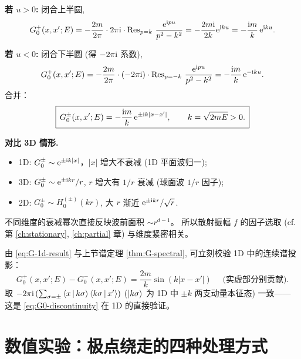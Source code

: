 \textbf{若 $u>0$:} 闭合上半圆,
\begin{equation}
  G_0^+(x,x';E)
  = -\frac{2m}{2\pi}\cdot 2\pi\mathrm{i}\cdot\operatorname{Res}_{p=k}\,\frac{\mathrm{e}^{\mathrm{i} pu}}{p^2-k^2}
  = -\frac{2m\mathrm{i}}{2k}\mathrm{e}^{\mathrm{i} ku}
  = -\frac{\mathrm{i} m}{k}\,\mathrm{e}^{\mathrm{i} ku}.
\end{equation}

\textbf{若 $u<0$:} 闭合下半圆 (得 $-2\pi\mathrm{i}$ 系数),
\begin{equation}
  G_0^+(x,x';E)
  = -\frac{2m}{2\pi}\cdot(-2\pi\mathrm{i})\cdot\operatorname{Res}_{p=-k}\,\frac{\mathrm{e}^{\mathrm{i} pu}}{p^2-k^2}
  = -\frac{\mathrm{i} m}{k}\,\mathrm{e}^{-\mathrm{i} ku}.
\end{equation}
合并：
\begin{equation}\label{eq:G-1d-result}
  \boxed{\,G_0^\pm(x,x';E) = -\frac{\mathrm{i} m}{k}\,\mathrm{e}^{\pm\mathrm{i} k|x-x'|},\qquad k=\sqrt{2mE}>0.\,}
\end{equation}

\textbf{对比 3D 情形.}
\begin{itemize}
  \item 1D: $G_0^\pm \sim \mathrm{e}^{\pm\mathrm{i} k|x|}$，$|x|$ 增大不衰减 (1D 平面波归一);
  \item 3D: $G_0^\pm \sim \mathrm{e}^{\pm\mathrm{i} kr}/r$, $r$ 增大有 $1/r$ 衰减 (球面波 $1/r$ 因子);
  \item 2D: $G_0^\pm \sim H_0^{(\pm)}(kr)$, 大 $r$ 渐近 $\mathrm{e}^{\pm\mathrm{i} kr}/\sqrt{r}$.
\end{itemize}
不同维度的衰减幂次直接反映波前面积 $\sim r^{d-1}$。
所以散射振幅 $f$ 的因子选取 (cf. 第 \ref{ch:stationary}, \ref{ch:partial} 章) 与维度紧密相关。

\begin{remark}
由 \eqref{eq:G-1d-result} 与上节谱定理 \ref{thm:G-spectral}, 可立刻校验 1D 中的连续谱投影：
\begin{equation}
  G_0^+(x,x';E)-G_0^-(x,x';E)
  = \frac{2m}{k}\sin(k|x-x'|)\quad\text{ (实虚部分别贡献)}.
\end{equation}
取 $-2\pi\mathrm{i}\,(\sum_{\sigma=\pm}\left\langle x \,\middle|\, k\sigma \right\rangle\left\langle k\sigma \,\middle|\, x' \right\rangle)$
($\ket{k\sigma}$ 为 1D 中 $\pm k$ 两支动量本征态) 一致——
这是 \eqref{eq:G0-discontinuity} 在 1D 的直接验证。
\end{remark}

\section{数值实验：极点绕走的四种处理方式}\label{sec:numexp-ch07}

